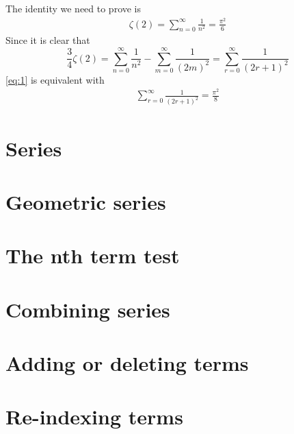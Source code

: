 \graphicspath{{./chap1/images/}}   

The identity we need to prove is
\begin{align}
    \zeta(2) = \sum_{n=0}^\infty \frac{1}{n^2} = \frac{\pi^2}{6} \tag{1}\label{eq:1}
\end{align}
Since it is clear that
\[
    \frac{3}{4}\zeta(2) = \sum_{n=0}^\infty \frac{1}{n^2} -  \sum_{m=0}^\infty \frac{1}{(2m)^2}= \sum_{r=0}^\infty \frac{1}{(2r+1)^2} 
\]
\eqref{eq:1} is equivalent with
\begin{align}
    \sum_{r=0}^\infty \frac{1}{(2r+1)^2} = \frac{\pi^2}{8} \tag{2}\label{eq:2}
\end{align}
\section{Series}
\section{Geometric series}
\section{The nth term test}
\section{Combining series}
\section{Adding or deleting terms}
\section{Re-indexing terms}